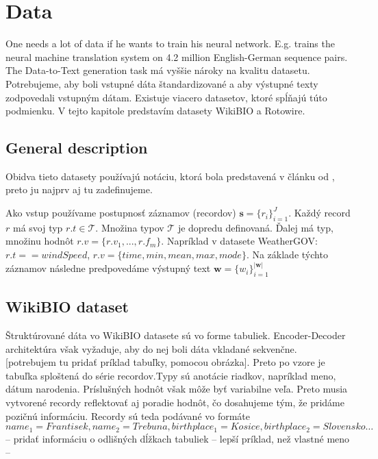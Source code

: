 \chapter{Data}

One needs a lot of data if he wants to train his neural network. E.g. \citep{sennrich2016} trains the neural machine translation system on 4.2 million English-German sequence pairs. The Data-to-Text generation task má vyššie nároky na kvalitu datasetu. Potrebujeme, aby boli vstupné dáta štandardizované a aby výstupné texty zodpovedali vstupným dátam. Existuje viacero datasetov, ktoré spĺňajú túto podmienku. V tejto kapitole predstavím datasety WikiBIO a Rotowire.

\section{General description}


Obidva tieto datasety používajú notáciu, ktorá bola predstavená v článku od \citep{liang-etal-2009-learning}, preto ju najprv aj tu zadefinujeme.

Ako vstup používame postupnosť záznamov (recordov) $ \mathbf{s} = \{ r_i \}_{i=1}^{J} $. Každý record $ r $ má svoj typ $ r.t \in \mathcal{T} $. Množina typov $\mathcal{T}$ je dopredu definovaná. Ďalej má typ, množinu hodnôt $ r.v = \{ r.v_1, ... , r.f_m\}$. Napríklad v datasete WeatherGOV: $ r.t == windSpeed $, $ r.v = \{time, min, mean, max, mode\}$. Na základe týchto záznamov následne predpovedáme výstupný text $ \mathbf{w} = \{ w_i\}_{i=1}^{ | \mathbf{w} | }$

\section{WikiBIO dataset}

Štruktúrované dáta vo WikiBIO datasete sú vo forme tabuliek. Encoder-Decoder architektúra však vyžaduje, aby do nej boli dáta vkladané sekvenčne. [potrebujem tu pridať príklad tabuľky, pomocou obrázka]. Preto po vzore \citep{lebret2016neural} je tabuľka sploštená do série recordov.Typy sú anotácie riadkov, napríklad meno, dátum narodenia. Príslušných hodnôt však môže byť variabilne veľa. Preto musia vytvorené recordy reflektovať aj poradie hodnôt, čo dosahujeme tým, že pridáme pozičnú informáciu. Recordy sú teda podávané vo formáte $ name_1 = Frantisek, name_2 = Trebuna, birthplace_1 = Kosice, birthplace_2 = Slovensko \dots$ -- pridať informáciu o odlišných dĺžkach tabuliek -- lepší príklad, než vlastné meno --

